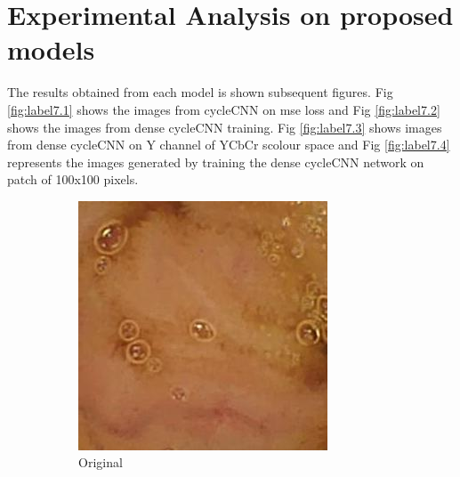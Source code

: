 \section{Experimental Analysis on proposed models}
The results obtained from each model is shown subsequent figures.
Fig \ref{fig:label7.1} shows the images from cycleCNN on mse loss and Fig \ref{fig:label7.2} shows the images from dense cycleCNN training. Fig \ref{fig:label7.3} shows images from dense cycleCNN on Y channel of YCbCr scolour space and Fig \ref{fig:label7.4} represents the images generated by training the dense cycleCNN network on patch of 100x100 pixels.

\begin{figure}[H]
    \centering

    \begin{subfigure}[b]{0.32\textwidth}
    \includegraphics[width=\textwidth]{Chapter7/hr_9.jpg}
    \caption{Original}
  \end{subfigure}
  \begin{subfigure}[b]{0.32\textwidth}

\end{subfigure}
\end{figure}
